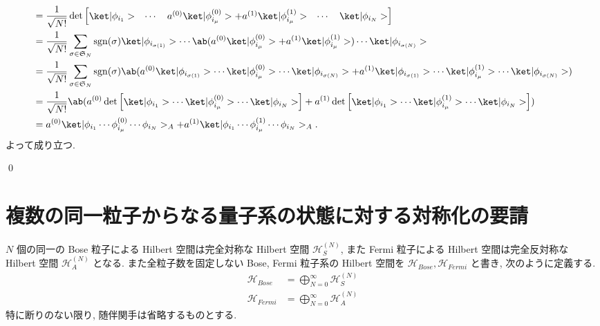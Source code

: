 \documentclass[uplatex,dvipdfmx,a4paper,11pt]{jlreq}
\makeatletter
\DeclareMathOperator{\sgn}{sgn}
\DeclareMathOperator{\Det}{det}
\newcommand{\HH}{\mathcal{H}}
\renewcommand{\SS}{\mathfrak{S}}
\numberwithin{equation}{section}
\theoremstyle{definition}
\renewenvironment{proof}[1][\proofname]{\par
  \normalfont
  \topsep6\p@\@plus6\p@ \trivlist
  \item[\hskip\labelsep{\bfseries #1}\@addpunct{\bfseries}]\ignorespaces\quad\par
}{
  \qed\endtrivlist\@endpefalse
}
\renewcommand\proofname{証明}
\makeatother
\begin{document}
\begin{proof}
\begin{align}
     & = \frac{1}{\sqrt{N!}}\Det\begin{bmatrix}\ket|\phi_{i_1}> & \cdots & a^{(0)}\ket|\phi_{i_\mu}^{(0)}> + a^{(1)}\ket|\phi_{i_\mu}^{(1)}> & \cdots & \ket|\phi_{i_N}>\end{bmatrix}                                                                               \\
     & = \frac{1}{\sqrt{N!}}\sum_{\sigma\in\SS_N}\sgn(\sigma)\ket|\phi_{i_{\sigma(1)}}>\cdots\ab(a^{(0)}\ket|\phi_{i_\mu}^{(0)}> + a^{(1)}\ket|\phi_{i_\mu}^{(1)}>)\cdots\ket|\phi_{i_{\sigma(N)}}>                                                                 \\
     & = \frac{1}{\sqrt{N!}}\sum_{\sigma\in\SS_N}\sgn(\sigma)\ab(a^{(0)}\ket|\phi_{i_{\sigma(1)}}>\cdots\ket|\phi_{i_\mu}^{(0)}>\cdots\ket|\phi_{i_{\sigma(N)}}> + a^{(1)}\ket|\phi_{i_{\sigma(1)}}>\cdots\ket|\phi_{i_\mu}^{(1)}>\cdots\ket|\phi_{i_{\sigma(N)}}>) \\
     & = \frac{1}{\sqrt{N!}}\ab(a^{(0)}\Det\begin{bmatrix}\ket|\phi_{i_1}>\cdots\ket|\phi_{i_\mu}^{(0)}>\cdots\ket|\phi_{i_N}>\end{bmatrix} + a^{(1)}\Det\begin{bmatrix}\ket|\phi_{i_1}>\cdots\ket|\phi_{i_\mu}^{(1)}>\cdots\ket|\phi_{i_N}>\end{bmatrix})          \\
     & = a^{(0)}\ket|\phi_{i_1}\cdots\phi_{i_\mu}^{(0)}\cdots\phi_{i_N}>_A + a^{(1)}\ket|\phi_{i_1}\cdots\phi_{i_\mu}^{(1)}\cdots\phi_{i_N}>_A.
  \end{align}
  よって成り立つ.
\end{proof}

\section{複数の同一粒子からなる量子系の状態に対する対称化の要請}
\begin{definition}[スピン統計定理]
  $N$ 個の同一の Bose 粒子による Hilbert 空間は完全対称な Hilbert 空間 $\HH_S^{(N)}$, また Fermi 粒子による Hilbert 空間は完全反対称な Hilbert 空間 $\HH_A^{(N)}$ となる.
  また全粒子数を固定しない Bose, Fermi 粒子系の Hilbert 空間を $\HH_{Bose}, \HH_{Fermi}$ と書き, 次のように定義する.
  \begin{align}
    \HH_{Bose}  & = \bigoplus_{N = 0}^{\infty} \HH_S^{(N)} \\
    \HH_{Fermi} & = \bigoplus_{N = 0}^{\infty} \HH_A^{(N)}
  \end{align}
  特に断りのない限り, 随伴関手は省略するものとする.
\end{definition}
\end{document}
